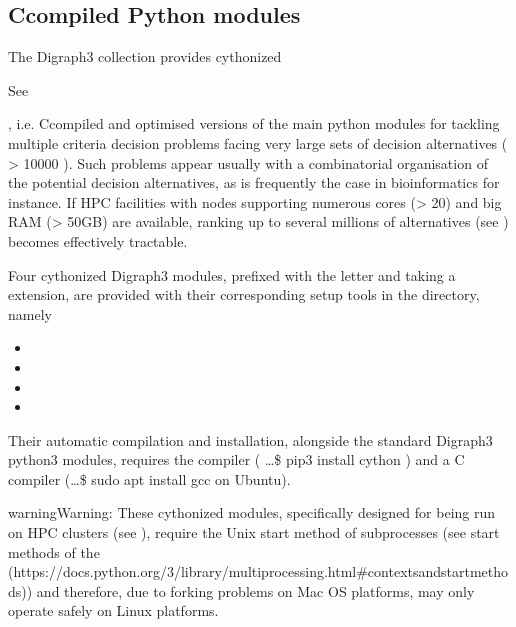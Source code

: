 \documentclass[a4paper,12pt,english]{sphinxhowto}
\begin{document}
\subsection{C\sphinxhyphen{}compiled Python modules}
\label{\detokenize{tutorial:c-compiled-python-modules}}
The Digraph3 collection provides cythonized %
\begin{footnote}[6]\sphinxAtStartFootnote
See 
%
\end{footnote}, i.e. C\sphinxhyphen{}compiled and optimised versions of the main python modules for tackling multiple criteria decision problems facing very large sets of decision alternatives ( \textgreater{} 10000 ). Such problems appear usually with a combinatorial organisation of the potential decision alternatives, as is frequently the case in bioinformatics for instance. If HPC facilities with nodes supporting numerous cores (\textgreater{} 20) and big RAM (\textgreater{} 50GB) are available, ranking up to several millions of alternatives (see ) becomes effectively tractable.

Four cythonized Digraph3 modules, prefixed with the letter  and taking a  extension, are provided with their corresponding setup tools in the  directory, namely
\begin{itemize}
\item {} 

\item {} 

\item {} 

\item {} 

\end{itemize}

Their automatic compilation and installation, alongside the standard Digraph3 python3 modules, requires the  compiler \sphinxfootnotemark[6] ( …\$ pip3 install cython ) and a C compiler (…\$ sudo apt install gcc on Ubuntu).

\begin{sphinxadmonition}{warning}{Warning:}
These cythonized modules, specifically designed for being run on HPC clusters (see ), require the Unix  start method of subprocesses (see start methods of the  (https://docs.python.org/3/library/multiprocessing.html\#contexts\sphinxhyphen{}and\sphinxhyphen{}start\sphinxhyphen{}methods))  and therefore, due to forking problems on Mac OS platforms, may only operate safely on Linux platforms.
\end{sphinxadmonition}
\end{document}
